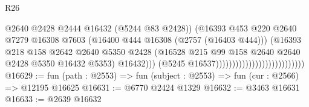 \begin{lexlean}{R26}
\begin{coremodule}
                                                            @2640
                                                            @2428
                                                            @2444
                                                            @16432
                                                            (@5244 @83 @2428))
                                                          (@16393
                                                            @453
                                                            @220
                                                            @2640
                                                            @7279
                                                            @16308
                                                            @7603
                                                            (@16400
                                                              @444
                                                              @16308
                                                              (@2757 (@16403 @444)))
                                                            (@16393
                                                              @218
                                                              @158
                                                              @2642
                                                              @2640
                                                              @5350
                                                              @2428
                                                              (@16528
                                                                @215
                                                                @99
                                                                @158
                                                                @2640
                                                                @2640
                                                                @2428
                                                                @5350
                                                                @16432
                                                                @5353)
                                                              @16432)))
                                                        (@5245 @16537)))))))))))))))))))))))))))
@16629 := fun (path : @2553) => fun (subject : @2553) => fun (cur : @2566) => @12195 @16625
@16631 := @6770 @2424 @1329
@16632 := @3463 @16631
@16633 := @2639 @16632

\end{coremodule}
\end{lexlean}
